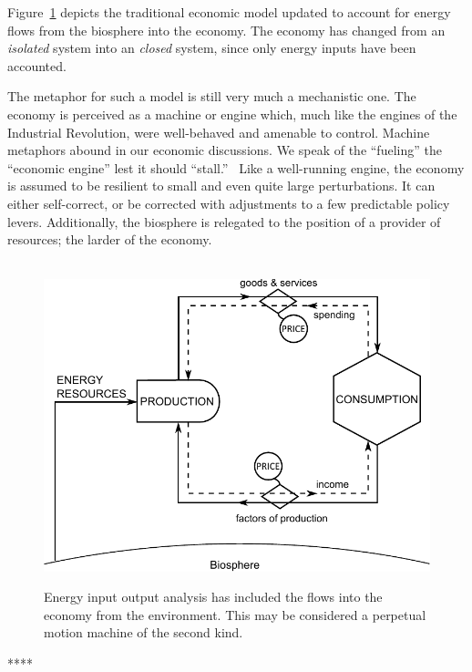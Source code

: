 Figure~\ref{fig:perp_motion_2} depicts the traditional
economic model updated to account for 
energy flows from the biosphere
into the economy.
The economy has changed from an \emph{isolated}
system into an \emph{closed} system,
since only energy inputs have been accounted.

The metaphor for such a model is still very much
a mechanistic one.
The economy is perceived as a machine or engine which,
much like the engines of the Industrial Revolution,
were well-behaved and amenable to control.
Machine metaphors abound in our economic discussions.
We speak of the ``fueling'' the ``economic engine'' 
lest it should ``stall.''~\cite{Liu2012}
Like a well-running engine, the economy is assumed 
to be resilient to small and even quite large perturbations.  
It can either self-correct, 
or be corrected with adjustments to
a few predictable policy levers. 
Additionally, the biosphere is relegated to the position
of a provider of resources;
the larder of the economy.\cite{Norgaard2010}

\begin{figure}[!ht]
\centering\
\includegraphics[width=\linewidth]{Part_0/Chapter_Introduction/images/Perpetual_motion_2.pdf}
\caption[The traditional model supplemented with energy inputs]{Energy input output 
analysis has included the flows into the economy from the environment.
This may be considered a perpetual motion machine 
of the second kind.}
\label{fig:perp_motion_2}
\end{figure}

****

